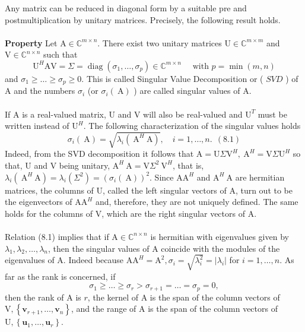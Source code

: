 \documentclass[11pt]{book}
\begin{document}
Any matrix can be reduced in diagonal form by a suitable pre and postmultiplication by unitary matrices. Precisely, the following result holds.\\ \\
\textbf{Property} Let $\mathrm{A} \in \mathbb{C}^{m \times n}$. There exist two unitary matrices $\mathrm{U} \in \mathbb{C}^{m \times m}$ and $\mathrm{V} \in \mathbb{C}^{n \times n}$ such that
$$
\mathrm{U}^H \mathrm{AV}=\Sigma=\operatorname{diag}\left(\sigma_1, \ldots, \sigma_p\right) \in \mathbb{C}^{m \times n} \quad \text { with } p=\min (m, n)
$$
and $\sigma_1 \geq \ldots \geq \sigma_p \geq 0$. This is called Singular Value Decomposition or ( $S V D$ ) of $\mathrm{A}$ and the numbers $\sigma_i$ (or $\sigma_i(\mathrm{~A})$ ) are called singular values of $\mathrm{A}$.\\ \\
If $\mathrm{A}$ is a real-valued matrix, $\mathrm{U}$ and $\mathrm{V}$ will also be real-valued and $\mathrm{U}^T$ must be written instead of $\mathrm{U}^H$. The following characterization of the singular values holds
$$
\sigma_i(\mathrm{~A})=\sqrt{\lambda_i\left(\mathrm{~A}^H \mathrm{~A}\right)}, \quad i=1, \ldots, n . \ \ (8.1)
$$
Indeed, from the SVD decomposition it follows that $\mathrm{A}=\mathrm{U} \Sigma \mathrm{V}^H, \mathrm{~A}^H=\mathrm{V} \Sigma \mathrm{U}^H$ so that, $\mathrm{U}$ and $\mathrm{V}$ being unitary, $\mathrm{A}^H \mathrm{~A}=\mathrm{V} \Sigma^2 \mathrm{~V}^H$, that is, $\lambda_i\left(\mathrm{~A}^H \mathrm{~A}\right)=\lambda_i\left(\Sigma^2\right)=\left(\sigma_i(\mathrm{~A})\right)^2$. Since $\mathrm{AA}^H$ and $\mathrm{A}^H \mathrm{~A}$ are hermitian matrices, the columns of $\mathrm{U}$, called the left singular vectors of $\mathrm{A}$, turn out to be the eigenvectors of $\mathrm{AA}^H$ and, therefore, they are not uniquely defined. The same holds for the columns of $\mathrm{V}$, which are the right singular vectors of $\mathrm{A}$.\\ \\
Relation (8.1) implies that if $\mathrm{A} \in \mathbb{C}^{n \times n}$ is hermitian with eigenvalues given by $\lambda_1, \lambda_2, \ldots, \lambda_n$, then the singular values of A coincide with the modules of the eigenvalues of $\mathrm{A}$. Indeed because $\mathrm{AA}^H=\mathrm{A}^2, \sigma_i=\sqrt{\lambda_i^2}=\left|\lambda_i\right|$ for $i=1, \ldots, n$. As far as the rank is concerned, if
$$
\sigma_1 \geq \ldots \geq \sigma_r>\sigma_{r+1}=\ldots=\sigma_p=0,
$$
then the rank of A is $r$, the kernel of A is the span of the column vectors of $\mathrm{V},\left\{\mathbf{v}_{r+1}, \ldots, \mathbf{v}_n\right\}$, and the range of $\mathrm{A}$ is the span of the column vectors of $\mathrm{U},\left\{\mathbf{u}_1, \ldots, \mathbf{u}_r\right\}$.\\ \\
\end{document}
